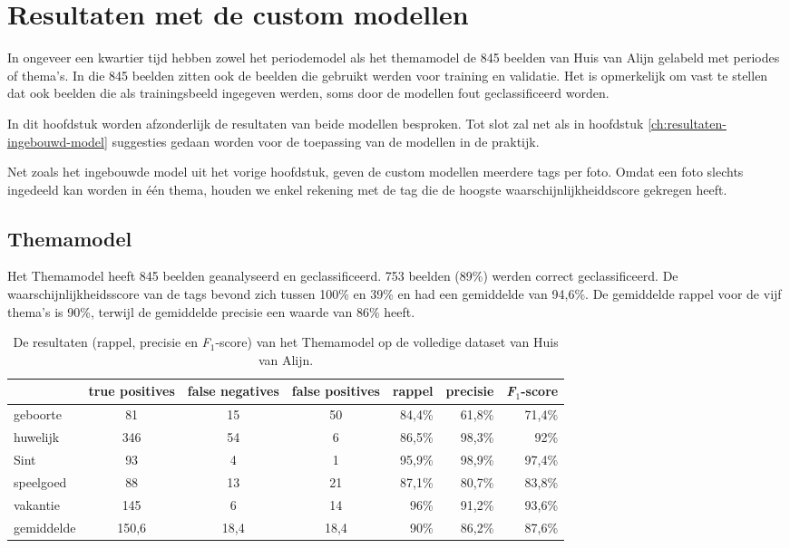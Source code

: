 \chapter{Resultaten met de custom  modellen}
\label{ch:resultaten-custom-model}

In ongeveer een kwartier tijd hebben zowel het periodemodel als het themamodel de 845 beelden van Huis van Alijn gelabeld met periodes of thema’s. In die 845 beelden zitten ook de beelden die gebruikt werden voor training en validatie. Het is opmerkelijk om vast te stellen dat ook beelden die als trainingsbeeld ingegeven werden, soms door de modellen fout geclassificeerd worden.

In dit hoofdstuk worden afzonderlijk de resultaten van beide modellen besproken. Tot slot zal net als in hoofdstuk \ref{ch:resultaten-ingebouwd-model} suggesties gedaan worden voor de toepassing van de modellen in de praktijk.
    
Net zoals het ingebouwde model uit het vorige hoofdstuk, geven de custom modellen meerdere tags per foto. Omdat een foto slechts ingedeeld kan worden in één thema, houden we enkel rekening met de tag die de hoogste waarschijnlijkheiddscore gekregen heeft. 

\section{Themamodel}
\label{sec:themamodel}

Het Themamodel heeft 845 beelden geanalyseerd en geclassificeerd. 753 beelden (89\%) werden correct geclassificeerd.  De waarschijnlijkheidsscore van de tags bevond zich tussen 100\% en 39\% en had een gemiddelde van 94,6\%. De gemiddelde rappel voor de vijf thema’s is 90\%, terwijl de gemiddelde precisie een waarde van 86\% heeft.

\begin{table}
	\centering
     \renewcommand\arraystretch{1.2}
    \begin{tabular}{l|ccc|rrr}
        \toprule
         & true positives  & false negatives & false positives & rappel & precisie & \textit{F$_{1}$}-score \\
        \midrule
        geboorte & 81 & 15 & 50 & 84,4\% & 61,8\% & 71,4\% \\
        huwelijk & 346 & 54 & 6 & 86,5\% & 98,3\% & 92\% \\
        Sint & 93 & 4 & 1 & 95,9\% & 98,9\% & 97,4\% \\
        speelgoed & 88 & 13 & 21 & 87,1\% & 80,7\% & 83,8\% \\
        vakantie & 145 & 6 & 14 & 96\% & 91,2\% & 93,6\% \\
        \midrule
        gemiddelde & 150,6 & 18,4 & 18,4 & 90\% & 86,2\% & 87,6\% \\
        \bottomrule
    \end{tabular}
    \caption{De resultaten (rappel, precisie en \textit{F$_{1}$}-score) van het Themamodel op de volledige dataset van Huis van Alijn.}
    \label{tab:resultaten-themamodel}
\end{table}

